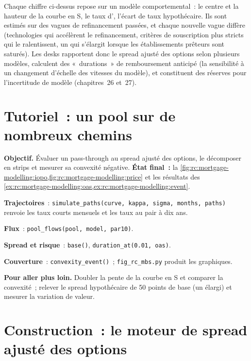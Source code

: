 Chaque chiffre ci-dessus repose sur un modèle comportemental~: le centre et la hauteur de la courbe en S,
le taux d', l'écart de taux hypothécaire. Ils sont estimés sur des vagues de refinancement passées,
et chaque nouvelle vague diffère (technologies qui accélèrent le refinancement, critères de souscription plus stricts
qui le ralentissent, un  qui s'élargit lorsque les établissements prêteurs sont saturés).
Les desks rapportent donc le spread ajusté des options selon plusieurs modèles,
calculent des «~durations~» de remboursement anticipé (la sensibilité à un changement d'échelle des vitesses du modèle),
et constituent des réserves pour l'incertitude de modèle (chapitres~26 et~27).

\section{Tutoriel~: un pool sur de nombreux chemins}\label{tut:rc:mortgage-modelling:tutorial}

\begin{tutorial}
\textbf{Objectif.} Évaluer un pass-through au spread ajusté des options, le décomposer en strips
et mesurer sa convexité négative. \textbf{État final~:}
la \cref{fig:rc:mortgage-modelling:iopo,fig:rc:mortgage-modelling:price} et les résultats des
\cref{ex:rc:mortgage-modelling:oas,ex:rc:mortgage-modelling:event}.
\begin{tutsteps}
\item \textbf{Trajectoires}~: \texttt{simulate\_paths(curve, kappa, sigma, months, paths)} renvoie
les taux courts mensuels et les taux au pair à dix ans.
\item \textbf{Flux}~: \texttt{pool\_flows(pool, model, par10)}.
\item \textbf{Spread et risque}~: \texttt{base()}, \texttt{duration\_at(0.01, oas)}.
\item \textbf{Couverture}~: \texttt{convexity\_event()}~; \texttt{fig\_rc\_mbs.py} produit les
graphiques.
\end{tutsteps}
\textbf{Pour aller plus loin.} Doubler la pente de la courbe en S et comparer la convexité~;
relever le spread hypothécaire de 50 points de base (un  élargi) et
mesurer la variation de valeur.
\end{tutorial}

\section{Construction~: le moteur de spread ajusté des options}\label{bld:rc:mortgage-modelling:mbsoas}

